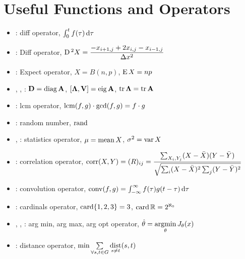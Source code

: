 \documentclass{article}
\begin{document}
\section{Useful Functions and Operators}
\begin{itemize}
\item {}: diff operator, $\int_0^t f(\tau) \operatorname{d\!} \tau$
\item {}: Diff operator, $\operatorname{D}{}^2 X = \dfrac{-x_{i + 1, j} + 2x_{i, j} - x_{i - 1, j}}{\Delta x^2}$
\item {}: Expect operator, $X = B(n, p)$, $\operatorname{E} X = np$
\item {}, , : ${\mathbf D} = \operatorname{diag} {\mathbf A}$, $[{\bm \Lambda}, {\mathbf V}] = \operatorname{eig} {\mathbf A}$, $\operatorname{tr} {\bm \Lambda} = \operatorname{tr} {\mathbf A}$
\item {}: lcm operator, $\operatorname{lcm}(f, g) \cdot \gcd(f, g) = f \cdot g$
\item {}: random number, $\operatorname{rand}$
\item {}, : statistics operator, $\mu = \operatorname{mean} X$, $\sigma^2 = \operatorname{var} X$
\item {}: correlation operator, $\operatorname{corr}(X, Y) = (R)_{ij} = \dfrac{\sum_{X_i, Y_j}(X - \bar X)(Y - \bar Y)}{\sqrt{\sum_i(X - \bar X)^2\sum_j(Y - \bar Y)^2}}$
\item {}: convolution operator, $\operatorname{conv}(f, g) = \int_{-\infty}^\infty f(\tau)g(t - \tau) \operatorname{d\!} \tau$
\item {}: cardinals operator, $\operatorname{card} \{1, 2, 3\} = 3$, $\operatorname{card} {\mathbb R} = 2^{\aleph_0}$
\item {}, , : arg min, arg max, arg opt operator, $\hat \theta = \operatorname*{argmin}\limits_\theta J_\theta(x)$
\item {}: distance operator, $\min \sum\limits_{\forall s, t \in G} \operatorname*{dist}\limits_{s \ne t} (s, t)$
\end{itemize}
\end{document}
